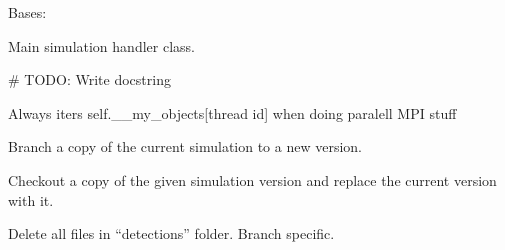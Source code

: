 \documentclass[letterpaper,10pt,english]{sphinxmanual}
\begin{document}

\begin{fulllineitems}
\label{\detokenize{modules/simulation:simulation.Simulation}}
Bases: 

Main simulation handler class.

\# TODO: Write docstring

Always iters self.\_\_my\_objects{[}thread id{]} when doing paralell MPI stuff

\begin{fulllineitems}
\label{\detokenize{modules/simulation:simulation.Simulation.branch_simulation}}
Branch a copy of the current simulation to a new version.

\end{fulllineitems}


\begin{fulllineitems}
\label{\detokenize{modules/simulation:simulation.Simulation.check_load}}
\end{fulllineitems}


\begin{fulllineitems}
\label{\detokenize{modules/simulation:simulation.Simulation.checkout_simulation}}
Checkout a copy of the given simulation version and replace the current version with it.

\end{fulllineitems}


\begin{fulllineitems}
\label{\detokenize{modules/simulation:simulation.Simulation.clear_detections}}
Delete all files in “detections” folder. Branch specific.


\end{fulllineitems}
\end{fulllineitems}
\end{document}

